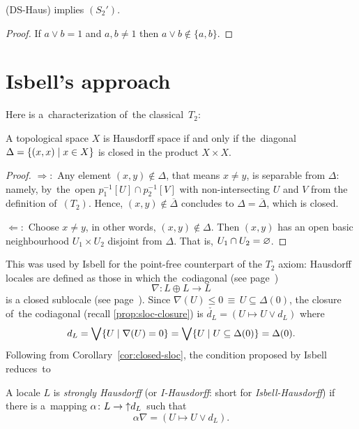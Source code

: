 \begin{prop} \label{prop:DS-Haus->S2'}
  (DS-Haus) implies $(S_2')$.
\end{prop}
\begin{proof}
  If $a \vee b = 1$ and $a, b \ne 1$ then $a \vee b\not\in \{ a, b \}$.
\end{proof}

\section{Isbell's approach}

Here is a~characterization of~the classical~$T_2$:

\begin{prop}
  A topological space $X$ is Hausdorff space if and only if the~diagonal
  $\Delta = \left\{(x, x) \mid x\in X \right\}$ is closed in the product
  $X\times X$.
\end{prop}

\begin{proof}
  $\Rightarrow:$ Any element $(x, y)\not\in \Delta$, that means $x \ne y$, is
  separable from $\Delta$:
  namely, by~the~open $p_1^{-1}[U] \cap p_2^{-1}[V]$ with non-intersecting $U$
  and $V$ from the definition of~$(T_2)$.
  Hence, $(x, y)\not\in \overline{\Delta}$ concludes to $\Delta =
  \overline{\Delta}$, which is closed.

  $\Leftarrow:$ Choose $x \ne y$, in other words, $(x, y)\not\in \Delta$.
  Then $(x, y)$ has an open basic neighbourhood $U_1\times U_2$ disjoint from
  $\Delta$.
  That is, $U_1 \cap U_2 = \varnothing$.
\end{proof}

This was used by Isbell \cite{isbell72} for the point-free counterpart of the
$T_2$ axiom:
Hausdorff locales are defined as those in which the~codiagonal (see
page~\pageref{codiag-in-Frm})
\[
  \nabla\colon L \oplus L \to L
\]
is a closed sublocale (see page~\pageref{df:closed-sloc}).
Since $\nabla(U) \le 0 \, \equiv \, U \subseteq \Delta(0)$, the closure of~the
codiagonal (recall \ref{prop:sloc-closure}) is $\check{d_L} = (U
\mapsto U \vee d_L)$ where
\[
  d_L
  = \bigvee \{ U \mid \nabla(U) = 0 \}
  = \bigvee \{ U \mid U \subseteq \Delta(0) \}
  = \Delta(0).
\]
Following from Corollary~\ref{cor:closed-sloc}, the condition proposed by
Isbell reduces~to

\begin{framed}
  \begin{df}[I-Haus]
    A locale $L$ is \emph{strongly Hausdorff\/} (or \emph{I-Hausdorff}: short
    for \emph{Isbell-Hausdorff}) if there is a~mapping $\alpha\colon L \to
    \left\uparrow d_L \right.$ such that
    \[
      \alpha \nabla = (U \mapsto U \vee d_L).
    \]
  \end{df}
\end{framed}

